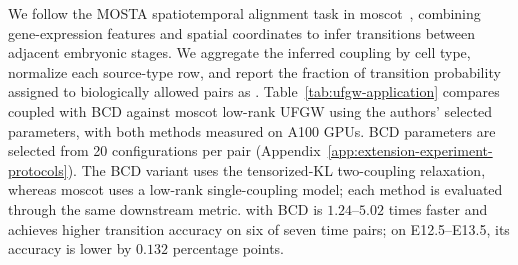 We follow the MOSTA spatiotemporal alignment task in moscot~\citep{klein2025mapping}, combining gene-expression features and spatial coordinates to infer transitions between adjacent embryonic stages.
We aggregate the inferred coupling by cell type, normalize each source-type row, and report the fraction of transition probability assigned to biologically allowed pairs as \transitionacc.
Table~\ref{tab:ufgw-application} compares \ourssparsink coupled with BCD against moscot low-rank UFGW using the authors' selected parameters, with both methods measured on A100 GPUs.
BCD parameters are selected from 20 configurations per pair (Appendix~\ref{app:extension-experiment-protocols}).
The BCD variant uses the tensorized-KL two-coupling relaxation, whereas moscot uses a low-rank single-coupling model; each method is evaluated through the same downstream metric.
\ourssparsink with BCD is $1.24$--$5.02$ times faster and achieves higher transition accuracy on six of seven time pairs; on E12.5--E13.5, its accuracy is lower by $0.132$ percentage points.

